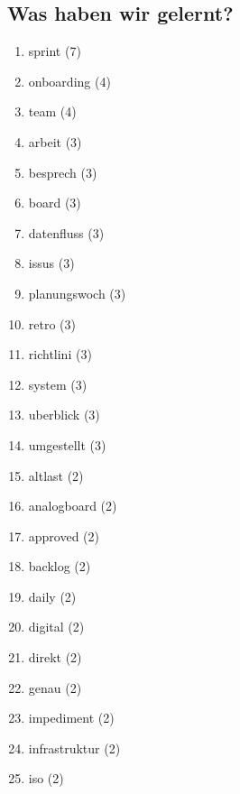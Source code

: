 \subsection*{Was haben wir gelernt?}
\begin{enumerate}
    \item sprint (7)
    \item onboarding (4)
    \item team (4)
    \item arbeit (3)
    \item besprech (3)
    \item board (3)
    \item datenfluss (3)
    \item issus (3)
    \item planungswoch (3)
    \item retro (3)
    \item richtlini (3)
    \item system (3)
    \item uberblick (3)
    \item umgestellt (3)
    \item altlast (2)
    \item analogboard (2)
    \item approved (2)
    \item backlog (2)
    \item daily (2)
    \item digital (2)
    \item direkt (2)
    \item genau (2)
    \item impediment (2)
    \item infrastruktur (2)
    \item iso (2)
\end{enumerate}

